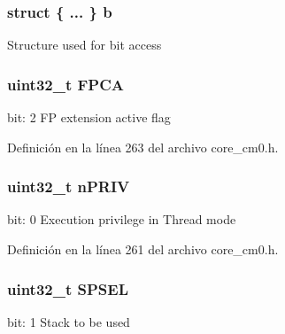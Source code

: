 \subsubsection[{\texorpdfstring{b}{b}}]{\setlength{\rightskip}{0pt plus 5cm}struct \{ ... \}   b}\hypertarget{union_c_o_n_t_r_o_l___type_a61325b30c8fcf7dda2cc7b5e1d7aa2b4}{}\label{union_c_o_n_t_r_o_l___type_a61325b30c8fcf7dda2cc7b5e1d7aa2b4}
Structure used for bit access 
\subsubsection[{\texorpdfstring{F\+P\+CA}{FPCA}}]{\setlength{\rightskip}{0pt plus 5cm}uint32\+\_\+t F\+P\+CA}\hypertarget{union_c_o_n_t_r_o_l___type_a2518558c090f60161ba4e718a54ee468}{}\label{union_c_o_n_t_r_o_l___type_a2518558c090f60161ba4e718a54ee468}
bit\+: 2 FP extension active flag 

Definición en la línea 263 del archivo core\+\_\+cm0.\+h.

\subsubsection[{\texorpdfstring{n\+P\+R\+IV}{nPRIV}}]{\setlength{\rightskip}{0pt plus 5cm}uint32\+\_\+t n\+P\+R\+IV}\hypertarget{union_c_o_n_t_r_o_l___type_a2a6e513e8a6bf4e58db169e312172332}{}\label{union_c_o_n_t_r_o_l___type_a2a6e513e8a6bf4e58db169e312172332}
bit\+: 0 Execution privilege in Thread mode 

Definición en la línea 261 del archivo core\+\_\+cm0.\+h.

\subsubsection[{\texorpdfstring{S\+P\+S\+EL}{SPSEL}}]{\setlength{\rightskip}{0pt plus 5cm}uint32\+\_\+t S\+P\+S\+EL}\hypertarget{union_c_o_n_t_r_o_l___type_ae185aac93686ffc78e998a9daf41415b}{}\label{union_c_o_n_t_r_o_l___type_ae185aac93686ffc78e998a9daf41415b}
bit\+: 1 Stack to be used 

